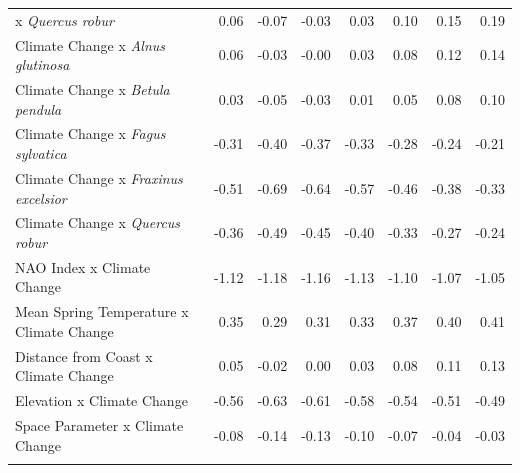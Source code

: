 \documentclass{article}\usepackage[]{graphicx}\usepackage[]{color}
\begin{document}
\begin{longtable}{lrrrrrrr}
x\textit{ Quercus robur} & 0.06 & -0.07 & -0.03 & 0.03 & 0.10 & 0.15 & 0.19 \\ 
  Climate Change
x\textit{ Alnus glutinosa} & 0.06 & -0.03 & -0.00 & 0.03 & 0.08 & 0.12 & 0.14 \\ 
  Climate Change
x\textit{ Betula pendula} & 0.03 & -0.05 & -0.03 & 0.01 & 0.05 & 0.08 & 0.10 \\ 
  Climate Change
x\textit{ Fagus sylvatica} & -0.31 & -0.40 & -0.37 & -0.33 & -0.28 & -0.24 & -0.21 \\ 
  Climate Change
x\textit{ Fraxinus excelsior} & -0.51 & -0.69 & -0.64 & -0.57 & -0.46 & -0.38 & -0.33 \\ 
  Climate Change
x\textit{ Quercus robur} & -0.36 & -0.49 & -0.45 & -0.40 & -0.33 & -0.27 & -0.24 \\ 
  NAO Index x Climate Change & -1.12 & -1.18 & -1.16 & -1.13 & -1.10 & -1.07 & -1.05 \\ 
  Mean Spring 
Temperature x Climate Change & 0.35 & 0.29 & 0.31 & 0.33 & 0.37 & 0.40 & 0.41 \\ 
  Distance from 
Coast x Climate Change & 0.05 & -0.02 & 0.00 & 0.03 & 0.08 & 0.11 & 0.13 \\ 
  Elevation x Climate Change & -0.56 & -0.63 & -0.61 & -0.58 & -0.54 & -0.51 & -0.49 \\ 
  Space Parameter x Climate Change & -0.08 & -0.14 & -0.13 & -0.10 & -0.07 & -0.04 & -0.03 \\ 
   \hline
\hline
\label{tab:suppmodfive}
\end{longtable}
\end{document}
